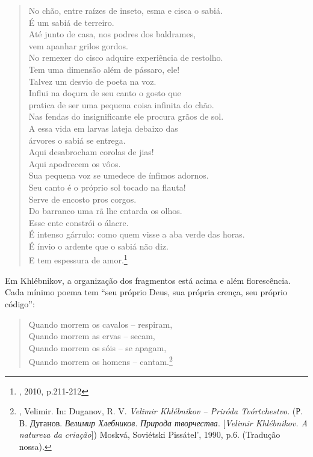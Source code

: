 \begin{verse}
No chão, entre raízes de inseto, esma e cisca \qb{}o sabiá. \\
É um sabiá de terreiro. \\
Até junto de casa, nos podres dos baldrames, \\
vem apanhar grilos gordos. \\
No remexer do cisco adquire experiência de \qb{}restolho. \\
Tem uma dimensão além de pássaro, ele! \\
Talvez um desvio de poeta na voz. \\
Influi na doçura de seu canto o gosto que \\
pratica de ser uma pequena coisa \qb{}infinita do chão. \\
Nas fendas do insignificante ele procura \qb{}grãos de sol. \\
A essa vida em larvas lateja debaixo das \\
árvores o sabiá se entrega. \\
Aqui desabrocham corolas de jias! \\
Aqui apodrecem os vôos. \\
Sua pequena voz se umedece de ínfimos \qb{}adornos. \\
Seu canto é o próprio sol tocado na flauta! \\
Serve de encosto pros corgos. \\
Do barranco uma rã lhe entarda os olhos. \\
Esse ente constrói o álacre. \\
É intenso gárrulo: como quem visse a aba \qb{}verde das horas. \\
É ínvio o ardente que o sabiá não diz. \\
E tem espessura de amor.\footnote{, 2010, p.211-212}
\end{verse}

Em Khlébnikov, a organização dos fragmentos está acima e além
florescência. Cada mínimo poema tem ``seu próprio Deus, sua própria
crença, seu próprio código'':

\begin{verse}
Quando morrem os cavalos -- respiram, \\
Quando morrem as ervas -- secam, \\
Quando morrem os sóis -- se apagam, \\
Quando morrem os homens -- cantam.\footnote{, Velimir.
  In: Duganov, R. V. \emph{Velimir Khlébnikov -- Priróda Tvórtchestvo}.
  (Р. В. Дуганов. \emph{Велимир Хлебников}. \emph{Природа творчества}.
  [\emph{Velimir Khlébnikov. A natureza da criação}]) Moskvá,
  Soviétski Pissátel', 1990, p.6. (Tradução nossa).}
\end{verse}

